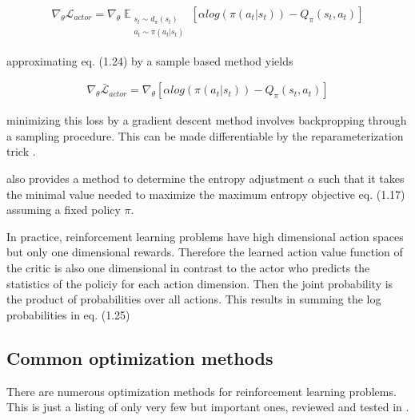 \begin{align}
\nabla_\theta \mathcal{L}_{actor} = \nabla_\theta \mathop{\mathbb{E}}_{\substack{s_t \sim d_\pi(s_t) \\ a_t \sim \pi(a_t|s_t)}} \left[ \alpha log(\pi(a_t|s_t)) - Q_\pi(s_t, a_t) \right]
\end{align}

approximating eq. (1.24) by a sample based method yields

\begin{align}
\nabla_\theta \bar{\mathcal{L}}_{actor} = \nabla_\theta \left[ \alpha log(\pi(a_t|s_t)) - Q_\pi(s_t, a_t) \right]
\end{align}

minimizing this loss by a gradient descent method involves backpropping through a sampling procedure. This can be made differentiable by the reparameterization trick \cite{kingma2013autoencoding}.

\cite{haarnoja2018soft} also provides a method to determine the entropy adjustment $\alpha$ such that it takes the minimal value needed to maximize the maximum entropy objective eq. (1.17) assuming a fixed policy $\pi$.

In practice, reinforcement learning problems have high dimensional action spaces but only one dimensional rewards. Therefore the learned action value function of the critic is also one dimensional in contrast to the actor who predicts the statistics of the policiy for each action dimension. Then the joint probability is the product of probabilities over all actions. This results in summing the log probabilities in eq. (1.25)

\subsection{Common optimization methods}\label{ssec:common_opt}
There are numerous optimization methods for reinforcement learning problems. This is just a listing of only very few but important ones, reviewed and tested in \cite{hessel2017rainbow}.

